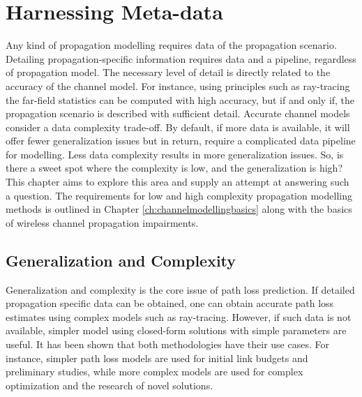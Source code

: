 \chapter{Harnessing Meta-data}\label{ch:satelliteImages}

    

Any kind of propagation modelling requires data of the propagation scenario. Detailing propagation-specific information requires data and a pipeline, regardless of propagation model. The necessary level of detail is directly related to the accuracy of the channel model. For instance, using principles such as ray-tracing the far-field statistics can be computed with high accuracy, but if and only if, the propagation scenario is described with sufficient detail. Accurate channel models consider a data complexity trade-off. By default, if more data is available, it will offer fewer generalization issues but in return, require a complicated data pipeline for modelling. Less data complexity results in more generalization issues. So, is there a sweet spot where the complexity is low, and the generalization is high? This chapter aims to explore this area and supply an attempt at answering such a question. The requirements for low and high complexity propagation modelling methods is outlined in Chapter \ref{ch:channelmodellingbasics} along with the basics of wireless channel propagation impairments. 


\section{Generalization and Complexity \label{sec:generalization}}



Generalization and complexity is the core issue of path loss prediction. If detailed propagation specific data can be obtained, one can obtain accurate path loss estimates using complex models such as ray-tracing. However, if such data is not available, simpler model using closed-form solutions with simple parameters are useful. It has been shown that both methodologies have their use cases. For instance, simpler path loss models are used for initial link budgets and preliminary studies, while more complex models are used for complex optimization and the research of novel solutions.


